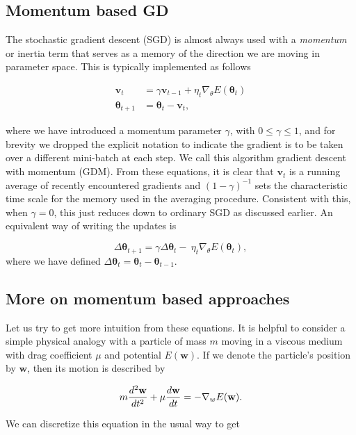 \documentclass[%
oneside,                 %
final,                   %
10pt]{article}
\begin{document}
\subsection*{Momentum based GD}

The stochastic gradient descent (SGD) is almost always used with a
\emph{momentum} or inertia term that serves as a memory of the direction we
are moving in parameter space.  This is typically implemented as
follows

\begin{align}
\mathbf{v}_{t}&=\gamma \mathbf{v}_{t-1}+\eta_{t}\nabla_\theta E(\boldsymbol{\theta}_t) \nonumber \\
\boldsymbol{\theta}_{t+1}&= \boldsymbol{\theta}_t -\mathbf{v}_{t},
\end{align}

where we have introduced a momentum parameter $\gamma$, with
$0\le\gamma\le 1$, and for brevity we dropped the explicit notation to
indicate the gradient is to be taken over a different mini-batch at
each step. We call this algorithm gradient descent with momentum
(GDM). From these equations, it is clear that $\mathbf{v}_t$ is a
running average of recently encountered gradients and
$(1-\gamma)^{-1}$ sets the characteristic time scale for the memory
used in the averaging procedure. Consistent with this, when
$\gamma=0$, this just reduces down to ordinary SGD as discussed
earlier. An equivalent way of writing the updates is

\[
\Delta \boldsymbol{\theta}_{t+1} = \gamma \Delta \boldsymbol{\theta}_t -\ \eta_{t}\nabla_\theta E(\boldsymbol{\theta}_t),
\]
where we have defined $\Delta \boldsymbol{\theta}_{t}= \boldsymbol{\theta}_t-\boldsymbol{\theta}_{t-1}$.

\subsection*{More on momentum based approaches}

Let us try to get more intuition from these equations. It is helpful
to consider a simple physical analogy with a particle of mass $m$
moving in a viscous medium with drag coefficient $\mu$ and potential
$E(\mathbf{w})$. If we denote the particle's position by $\mathbf{w}$,
then its motion is described by

\[
m {d^2 \mathbf{w} \over dt^2} + \mu {d \mathbf{w} \over dt }= -\nabla_w E(\mathbf{w}).
\]

We can discretize this equation in the usual way to get
\end{document}
